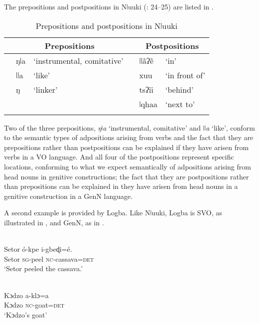 \documentclass[output=paper]{langsci/langscibook}
\begin{document}
The prepositions and postpositions in Nǀuuki (\citealt{CollinsNamaseb2011}: 24–25) are listed in .


\begin{table}
\caption{Prepositions and postpositions in Nǀuuki }
\label{extab:dryer:16}
\begin{tabularx}{\textwidth}{lll lll} 
\lsptoprule
 & \multicolumn{2}{c}{\bfseries Prepositions} &  & \multicolumn{2}{c}{\bfseries Postpositions}\\
\midrule
 & ŋǀa & ‘instrumental, comitative’ &  & ǀǀãʔẽ & ‘in’\\
 & ǀǀa & ‘like’ &  & xuu & ‘in front of’\\
 & ŋ & ‘linker’ &  & tsʔĩi & ‘behind’\\
 &  &  &  & ǀqhaa & ‘next to’\\
\lspbottomrule
\end{tabularx}
\end{table}

Two of the three prepositions, \textit{ŋǀa} ‘instrumental, comitative’ and \textit{ǀǀa} ‘like’, conform to the semantic types of adpositions arising from verbs and the fact that they are prepositions rather than postpositions can be explained if they have arisen from verbs in a VO language. And all four of the postpositions represent specific locations, conforming to what we expect semantically of adpositions arising from head nouns in genitive constructions; the fact that they are postpositions rather than prepositions can be explained in they have arisen from head nouns in a genitive construction in a GenN language.

A second example is provided by Logba. Like Nǀuuki, Logba is SVO, as illustrated in , and GenN, as in .

\ea\label{ex:dryer:17}
\\
\gll Setor  ó-kpe  i-gbeɖi=é.\\
       Setor  \textsc{sg}{}-peel  \textsc{nc}{}-cassava=\textsc{det}\\
\glt   ‘Setor peeled the cassava.’ 
\z

\ea\label{ex:dryer:18}
\\
\gll Kɔdzo    a-klɔ=a\\
       Kɔdzo    \textsc{nc}{}-goat=\textsc{det}\\
\glt   ‘Kɔdzo’s goat’ 
\z
\end{document}
